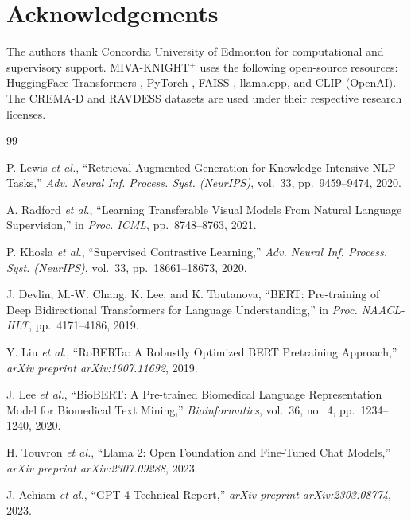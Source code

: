 \documentclass[10pt,conference]{IEEEtran}
\theoremstyle{ieeethm}
\theoremstyle{ieeedef}
\theoremstyle{ieeeremark}
\begin{document}
\section*{Acknowledgements}
The authors thank Concordia University of Edmonton for computational and supervisory support. \textsc{MIVA-KNIGHT}$^+$ uses the following open-source resources: HuggingFace Transformers \cite{wolf2020transformers}, PyTorch \cite{paszke2019pytorch}, FAISS \cite{johnson2019billion}, llama.cpp, and CLIP (OpenAI). The CREMA-D and RAVDESS datasets are used under their respective research licenses.

\balance

\begin{thebibliography}{99}

P. Lewis \textit{et al.},
``Retrieval-Augmented Generation for Knowledge-Intensive NLP Tasks,''
\textit{Adv. Neural Inf. Process. Syst. (NeurIPS)}, vol.~33, pp.~9459--9474, 2020.

A. Radford \textit{et al.},
``Learning Transferable Visual Models From Natural Language Supervision,''
in \textit{Proc. ICML}, pp.~8748--8763, 2021.

P. Khosla \textit{et al.},
``Supervised Contrastive Learning,''
\textit{Adv. Neural Inf. Process. Syst. (NeurIPS)}, vol.~33, pp.~18661--18673, 2020.

J. Devlin, M.-W. Chang, K. Lee, and K. Toutanova,
``BERT: Pre-training of Deep Bidirectional Transformers for Language Understanding,''
in \textit{Proc. NAACL-HLT}, pp.~4171--4186, 2019.

Y. Liu \textit{et al.},
``RoBERTa: A Robustly Optimized BERT Pretraining Approach,''
\textit{arXiv preprint arXiv:1907.11692}, 2019.

J. Lee \textit{et al.},
``BioBERT: A Pre-trained Biomedical Language Representation Model for Biomedical Text Mining,''
\textit{Bioinformatics}, vol.~36, no.~4, pp.~1234--1240, 2020.

H. Touvron \textit{et al.},
``Llama 2: Open Foundation and Fine-Tuned Chat Models,''
\textit{arXiv preprint arXiv:2307.09288}, 2023.

J. Achiam \textit{et al.},
``GPT-4 Technical Report,''
\textit{arXiv preprint arXiv:2303.08774}, 2023.


\end{thebibliography}
\end{document}
